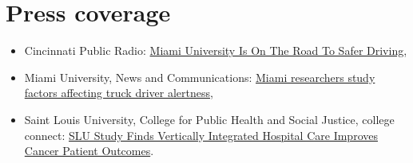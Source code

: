 \documentclass[11pt, a4paper]{article}
\newcommand{\years}[1]{\marginnote{\scriptsize #1}}
\begin{document}
	\section*{Press coverage}
	\begin{itemize}[leftmargin=0ex,itemsep=0ex, label={}]
	\item \years{2019} Cincinnati Public Radio: \href{https://www.wvxu.org/post/miami-university-road-safer-driving#stream/0}{Miami University Is On The Road To Safer Driving}, 
	
	\item \years{2019} Miami University, News and Communications: \href{https://miamioh.edu/news/top-stories/2019/06/fatigue-study.html}{Miami researchers study factors affecting truck driver alertness},
	
	\item \years{2019} Saint Louis University, College for Public Health and Social Justice, college connect:  \href{https://gallery.mailchimp.com/a3e4404ac622b2beb4b205f61/files/4cc71d2d-bdc4-4035-8ba6-b98ae42bedc3/SLU_Study_Finds_Vertically_Integrated_Hospital_Care_Improves_Cancer_Patient_Outcomes.pdf?utm_source=Unknown+List&utm_campaign=8d37abbd00-EMAIL_CAMPAIGN_2019_01_22_08_06&utm_medium=email&utm_term=0_-8d37abbd00-}{SLU Study Finds Vertically Integrated Hospital Care Improves Cancer Patient Outcomes}.
	\end{itemize}
	
\end{document}
